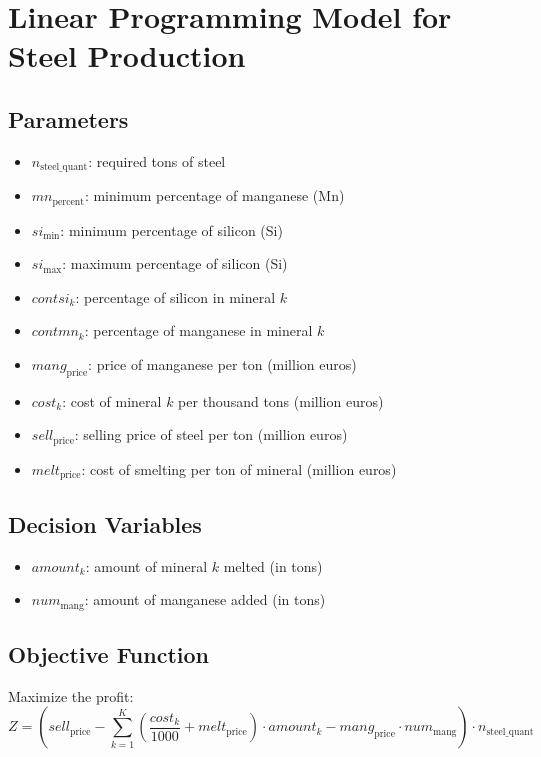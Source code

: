 \documentclass{article}
\begin{document}
\section*{Linear Programming Model for Steel Production}

\subsection*{Parameters}
\begin{itemize}
    \item $n_{\text{steel\_quant}}$: required tons of steel
    \item $mn_{\text{percent}}$: minimum percentage of manganese (Mn)
    \item $si_{\text{min}}$: minimum percentage of silicon (Si)
    \item $si_{\text{max}}$: maximum percentage of silicon (Si)
    \item $contsi_k$: percentage of silicon in mineral $k$
    \item $contmn_k$: percentage of manganese in mineral $k$
    \item $mang_{\text{price}}$: price of manganese per ton (million euros)
    \item $cost_k$: cost of mineral $k$ per thousand tons (million euros)
    \item $sell_{\text{price}}$: selling price of steel per ton (million euros)
    \item $melt_{\text{price}}$: cost of smelting per ton of mineral (million euros)
\end{itemize}

\subsection*{Decision Variables}
\begin{itemize}
    \item $amount_k$: amount of mineral $k$ melted (in tons)
    \item $num_{\text{mang}}$: amount of manganese added (in tons)
\end{itemize}

\subsection*{Objective Function}
Maximize the profit: 
\[
Z = \left( sell_{\text{price}} - \sum_{k=1}^{K} \left( \frac{cost_k}{1000} + melt_{\text{price}} \right) \cdot amount_k - mang_{\text{price}} \cdot num_{\text{mang}} \right) \cdot n_{\text{steel\_quant}}
\]
\end{document}
